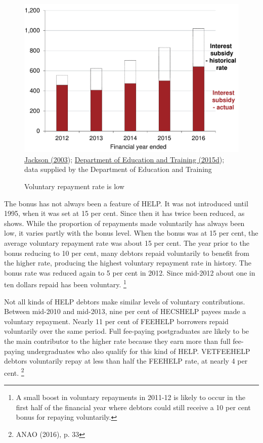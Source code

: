 \documentclass[embargoed]{grattan}
\begin{document}
\begin{figure}
\caption{Voluntary repayment rate is low}\label{fig:fig8-voluntary-repayment-rate-is-low}

\includegraphics[page=8]{atlas/Chartpack.pdf}
{\protect\hyperlink{_ENREF_50}{Jackson (2003}); \protect\hyperlink{_ENREF_27}{Department of Education and Training (2015d}); data supplied by the Department of Education and Training}
\end{figure}

The bonus has not always been a feature of \gls{HELP}.
It was not introduced until 1995, when it was set at 15 per cent.
Since then it has twice been reduced, as  shows.
While the proportion of repayments made voluntarily has always been low, it varies partly with the bonus level.
When the bonus was at 15 per cent, the average voluntary repayment rate was about 15 per cent.
The year prior to the bonus reducing to 10 per cent, many debtors repaid voluntarily to benefit from the higher rate, producing the highest voluntary repayment rate in history.
The bonus rate was reduced again to 5 per cent in 2012.
Since mid-2012 about one in ten dollars repaid has been voluntary.%
\footnote{A small boost in voluntary repayments in 2011-12 is likely to occur in the first half of the financial year where debtors could still receive a 10 per cent bonus for repaying voluntarily.}

Not all kinds of \gls{HELP} debtors make similar levels of voluntary contributions.
Between mid-2010 and mid-2013, nine per cent of \gls{HECSHELP} payees made a voluntary repayment.
Nearly 11 per cent of \gls{FEEHELP} borrowers repaid voluntarily over the same period.
Full fee-paying postgraduates are likely to be the main contributor to the higher rate because they earn more than full fee-paying undergraduates who also qualify for this kind of \gls{HELP}.
\gls{VETFEEHELP} debtors voluntarily repay at less than half the \gls{FEEHELP} rate, at nearly 4 per cent.%
\footnote{ANAO (2016), p. 33}
\end{document}

